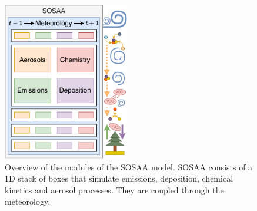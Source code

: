\begin{multicols}{2}
    \begin{figure}[H]
        \centering
        \includegraphics[width=0.49\textwidth]{background/figures/sosaa.pdf}
        \vspace{-1em}
        \caption[Overview of the Modules of the SOSAA Model]{Overview of the modules of the SOSAA model. SOSAA consists of a 1D stack of boxes that simulate emissions, deposition, chemical kinetics and aerosol processes. They are coupled through the meteorology.}
        \label{fig:sosaa-overview}
    \end{figure}


\end{multicols}
